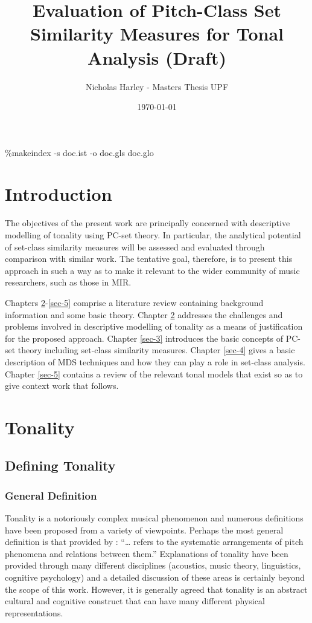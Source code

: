 \documentclass{article}
\title{Evaluation of Pitch-Class Set Similarity Measures for Tonal Analysis (Draft)}
\author{Nicholas Harley - Masters Thesis UPF}
\date{\today}
\begin{document}
\maketitle

\setcounter{tocdepth}{3}
\tableofcontents
\vspace*{1cm}


\clearpage
\glsaddall
\printglossary[title=PC-Set Theory Glossary]
\%makeindex -s doc.ist -o doc.gls doc.glo
\clearpage
\section{Introduction}
\label{sec-1}

The objectives of the present work are principally concerned with
descriptive modelling of tonality using PC-set theory. In particular,
the analytical potential of set-class similarity measures will be
assessed and evaluated through comparison with similar work. The
tentative goal, therefore, is to present this approach in such a way
as to make it relevant to the wider community of music researchers,
such as those in MIR.

Chapters \ref{sec-2}-\ref{sec-5} comprise a literature
review containing background information and some basic
theory. Chapter \ref{sec-2} addresses the challenges and problems
involved in descriptive modelling of tonality as a means of
justification for the proposed approach. Chapter \ref{sec-3} introduces the basic concepts of PC-set theory including
set-class similarity measures. Chapter \ref{sec-4}
gives a basic description of MDS techniques and how they can play a
role in set-class analysis. Chapter \ref{sec-5}
contains a review of the relevant tonal models that exist so as to
give context work that follows.
\section{Tonality}
\label{sec-2}
\subsection{Defining Tonality}
\label{sec-2-1}
\subsubsection{General Definition}
\label{sec-2-1-1}

Tonality is a notoriously complex musical phenomenon and numerous
definitions have been proposed from a variety of viewpoints. Perhaps
the most general definition is that provided by \citet{Hyer2013}:
``\ldots{} refers to the systematic arrangements of pitch phenomena and
relations between them.'' Explanations of tonality have been provided
through many different disciplines (acoustics, music theory,
linguistics, cognitive psychology) and a detailed discussion of these
areas is certainly beyond the scope of this work. However, it is
generally agreed that tonality is an abstract cultural and cognitive
construct that can have many different physical representations.
\end{document}

